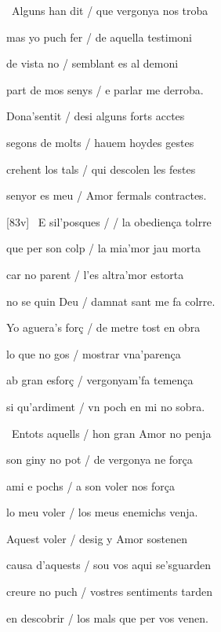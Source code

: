 \documentclass[12pt]{article}
\begin{document}
\begin{estrofa}

 \textparagraph\  Alguns han dit / que vergonya nos troba

 mas yo puch fer / de aquella testimoni

 de vista no / semblant es al demoni

 part de mos senys / e parlar me derroba.

 Dona'sentit / desi alguns forts acctes

 segons de molts / hauem hoydes gestes

 crehent los tals / qui descolen les festes

 senyor es meu / Amor fermals contractes.

\end{estrofa}



\begin{estrofa}

 [83v] \textparagraph\  E sil'posques / / la obedien\c{c}a tolrre

 que per son colp / la mia'mor jau morta

 car no parent / l'es altra'mor estorta

 no se quin Deu / damnat sant me fa colrre.

 Yo aguera's for\c{c} / de metre tost en obra

 lo que no gos / mostrar vna'paren\c{c}a

 ab gran esfor\c{c} / vergonyam'fa temen\c{c}a

 si qu'ardiment / vn poch en mi no sobra.

\end{estrofa}



\begin{estrofa}

 \textparagraph\  Entots aquells / hon gran Amor no penja

 son giny no pot / de vergonya ne for\c{c}a

 ami e pochs / a son voler nos for\c{c}a

 lo meu voler / los meus enemichs venja.

 Aquest voler / desig y Amor sostenen

 causa d'aquests / sou vos aqui se'sguarden

 creure no puch / vostres sentiments tarden

 en descobrir / los mals que per vos venen.

\end{estrofa}
\end{document}
